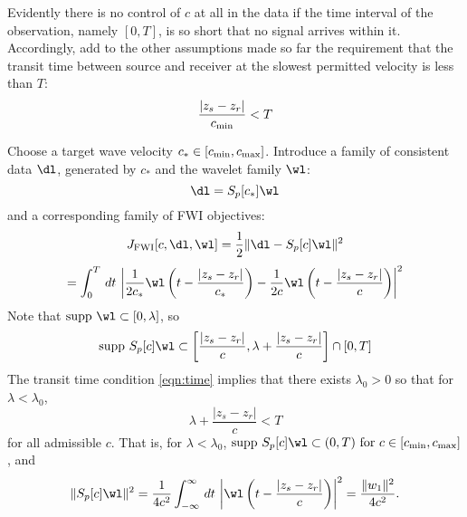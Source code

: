 Evidently there is no control of $c$ at all in the data if the time
interval of the observation, namely $[0,T]$, is so short that no
signal arrives within it. Accordingly, add to the other assumptions
made so far
the requirement that the transit time between source and receiver at
the slowest permitted velocity is less than $T$:
\begin{equation}
   \label{eqn:time}
  \frac{|z_s-z_r|}{c_{\rm min}} < T
\end{equation}

Choose a target wave velocity $c_* \in [c_{\rm min},c_{\rm
  max}]$. Introduce a family of consistent data $\dl$, generated by
$c_*$ and the wavelet family $\wl$:
\begin{equation}
  \label{eqn:dfam}
  \dl = S_p[c_*]\wl
\end{equation}
and a corresponding family of FWI objectives:
\[
  J_{\rm FWI}[c,\dl,\wl] = \frac{1}{2}\|\dl-S_p[c]\wl\|^2
\]
\begin{equation}
  \label{eqn:fwiexpl}
  =
  \int_0^T\,dt\,\left|\frac{1}{2c_*}\wl\left(t-\frac{|z_s-z_r|}{c_*}\right)
    - \frac{1}{2c}\wl\left(t-\frac{|z_s-z_r|}{c}\right)\right|^2
\end{equation}
Note that $\mbox{supp }\wl \subset [0,\lambda]$, so
\begin{equation}
  \label{eqn:wlsupps}
  \mbox{supp }S_p[c]\wl \subset \left[\frac{|z_s-z_r|}{c},\lambda
    +\frac{|z_s-z_r|}{c}\right] \cap [0,T]
\end{equation}
The transit time condition \ref{eqn:time} implies that there exists
$\lambda_0>0$ so that for $\lambda < \lambda_0$,
\[
  \lambda +\frac{|z_s-z_r|}{c} < T
\]
for all admissible $c$. That is, 
for $\lambda <\lambda_0$, $\mbox{supp }S_p[c]\wl \subset(0,T)\mbox{
  for }c \in [c_{\rm min},c_{\rm max}]$, and 
\begin{equation}
  \label{eqn:constnorm}
  \|S_p[c]\wl\|^2 = \frac{1}{4c^2}\int_{-\infty}^{\infty}\,dt\,\left|
    \wl\left(t-\frac{|z_s-z_r|}{c}\right)\right|^2 =
  \frac{\|w_1\|^2}{4c^2}.
\end{equation}

